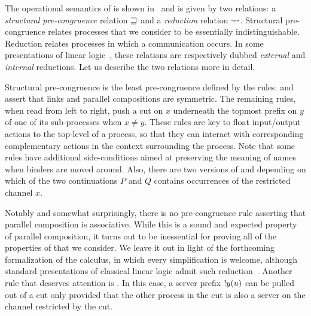 The operational semantics of \Calculus is shown in~ and
is given by two relations: a \emph{structural pre-congruence} relation $\sqsupseteq$
and a \emph{reduction} relation $\leadsto$. Structural pre-congruence relates
processes that we consider to be essentially indistinguishable. Reduction
relates processes in which a communication occurs. In some presentations of
linear logic~\cite{BaeldeDoumaneSaurin16,Doumane17}, these relations are
respectively dubbed \emph{external} and \emph{internal} reductions. Let us
describe the two relations more in detail.

Structural pre-congruence is the least pre-congruence defined by the
 rules.
%
\SLink and \SComm assert that links and parallel compositions are symmetric. The
remaining rules, when read from left to right, push a cut on $x$ underneath the
topmost prefix on $y$ of one of its sub-processes when $x \ne y$. These rules
are key to float input/output actions to the top-level of a process, so that
they can interact with corresponding complementary actions in the context
surrounding the process.
%
Note that some rules have additional side-conditions aimed at preserving the
meaning of names when binders are moved around. Also, there are two versions of
\SForkL and \SForkR depending on which of the two continuations $P$ and $Q$
contains occurrences of the restricted channel $x$.

Notably and somewhat surprisingly, there is no pre-congruence rule asserting
that parallel composition is associative. While this is a sound and expected
property of parallel composition, it turns out to be inessential for proving all
of the properties of \Calculus that we consider. We leave it out in light of the
forthcoming formalization of the calculus, in which every simplification is
welcome, although standard presentations of classical linear logic admit such
reduction~\cite{Doumane17}.
%
Another rule that deserves attention is \SServer. In this case, a server prefix
${!}y(u)$ can be pulled out of a cut only provided that the other process in
the cut is also a server on the channel restricted by the cut.


